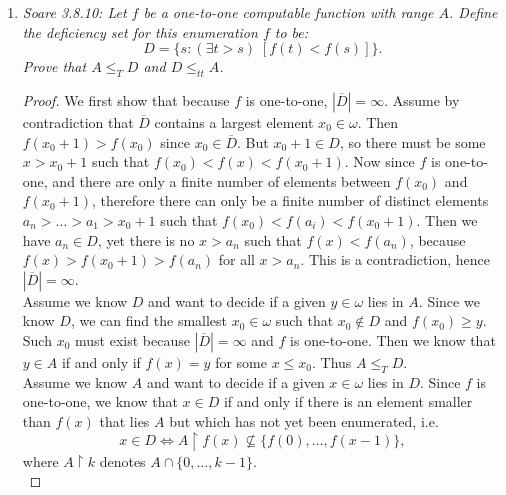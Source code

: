 \documentclass{article}
\begin{document}
\begin{enumerate}[label={\bf Q\arabic*:}]
\begin{proof}
      Observe that $\Phi^{\emptyset^{(n)}}_{g(x,y)}$ is the zero function
      if and only if $y$ is smaller than the least modulus of
      $\Phi_e^{\emptyset^{(n)}}(x,y_1)$ at $x$, seen as a function of
      $y_1$. Otherwise, $\Phi^{\emptyset^{(n)}}_{g(x,y)}$ is the function
      that never halts at any input. Therefore
      \[g(x,y) \in\emptyset^{(n+1)} \Rightarrow
      \Phi^{\emptyset^{(n)}}_{e}(x,y) =\lim_{y_1}
      \Phi^{\emptyset^{(n)}}_{e}(x,y_1).\]

      Hence
      \[h(x) =\Phi^{\emptyset^{(n)}}_{e}(x,y),\]
      where
      \[y =\mu y\; g(x,y)\in\emptyset^{(n+1)},\]
      and so
      \[h(x) \leq_T \emptyset^{(n+1)}.\]
    \end{proof}

  \item \it Soare 3.8.10: Let $f$ be a one-to-one computable function with
    range $A$. Define the deficiency set for this enumeration $f$ to be:
    \[D= \{s: (\exists t>s)\; \left[f(t)<f(s)\right]\}.\]
    Prove that $A\leq_TD$ and $D\leq_{tt}A$.

    \begin{proof}
      We first show that because $f$ is one-to-one,
      $|\overline{D}|=\infty$. Assume by contradiction that $\overline{D}$
      contains a largest element $x_0\in\omega$. Then $f(x_0+1)>f(x_0)$
      since $x_0\in\overline{D}$. But $x_0+1\in D$, so there must be some
      $x>x_0+1$ such that $f(x_0)<f(x)<f(x_0+1)$. Now since $f$ is
      one-to-one, and there are only a finite number of elements between
      $f(x_0)$ and $f(x_0+1)$, therefore there can only be a finite number
      of distinct elements $a_n>\ldots>a_1>x_0+1$ such that
      $f(x_0)<f(a_i)<f(x_0+1)$. Then we have $a_n\in D$, yet there is no
      $x>a_n$ such that $f(x)<f(a_n)$, because $f(x)>f(x_0+1)>f(a_n)$ for
      all $x>a_n$. This is a contradiction, hence $|\overline{D}|=\infty$.
      \\

      Assume we know $D$ and want to decide if a given $y\in\omega$ lies in
      $A$. Since we know $D$, we can find the smallest $x_0\in\omega$ such
      that $x_0\not\in D$ and $f(x_0)\geq y$. Such $x_0$ must exist because
      $|\overline{D}|=\infty$ and $f$ is one-to-one. Then we know that
      $y\in A$ if and only if $f(x)=y$ for some $x\leq x_0$. Thus $A\leq_T
      D$.\\

      Assume we know $A$ and want to decide if a given $x\in\omega$ lies in
      $D$. Since $f$ is one-to-one, we know that $x\in D$ if and only if
      there is an element smaller than $f(x)$ that lies $A$ but which has
      not yet been enumerated, i.e.
      \[x\in D \Leftrightarrow A\restriction f(x) \not\subseteq
      \{f(0),\ldots,f(x-1)\},\]
      where $A\restriction k$ denotes $A\cap\{0,\ldots,k-1\}$. \\


\end{proof}
\end{enumerate}
\end{document}
